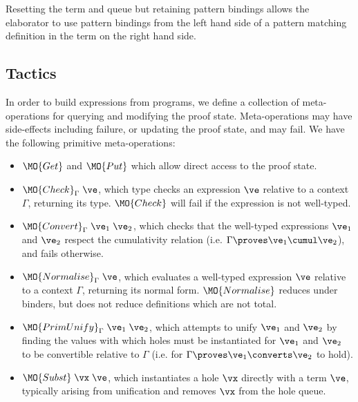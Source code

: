 \DM{
(\vC, \Delta, \hole{\vx}{\vt}\SC\vx, \langle\rangle, \langle\vx\rangle)
}

Resetting the term and queue but retaining pattern bindings
allows the elaborator to use pattern bindings from the left
hand side of a pattern matching definition in the term on the right hand side.


\newcommand{\Check}{\MO{Check}_\Gamma}
\newcommand{\Eval}{\MO{Normalise}_\Gamma}
\newcommand{\Unify}{\MO{Unify}_\Gamma}
\newcommand{\PrimUnify}{\MO{PrimUnify}_\Gamma}
\newcommand{\Subst}{\MO{Subst}}

\subsection{Tactics}

In order to build \TT{} expressions from \Idris{} programs, we define a collection
of meta-operations for querying and modifying the proof state. Meta-operations
may have side-effects including failure, or updating the proof state, and
may fail. We have the following primitive meta-operations:

\begin{itemize}
\item $\MO{Get}$ and $\MO{Put}$ which allow direct access to the proof state.
\item $\Check\;\ve$, which type checks an expression $\ve$ relative to a context
$\Gamma$, returning its type.
$\MO{Check}$ will fail
if the expression is not well-typed.
\item $\MO{Convert}_\Gamma\;\ve_1\;\ve_2$, which checks that the well-typed
expressions $\ve_1$ and $\ve_2$ respect the cumulativity relation 
(i.e. $\Gamma\proves\ve_1\cumul\ve_2$), and fails otherwise.
\item $\Eval\;\ve$, which evaluates a well-typed expression $\ve$ relative to a context 
$\Gamma$, returning its normal form. $\MO{Normalise}$ reduces under binders,
but does not reduce definitions which are not total.
\item 
$\PrimUnify\;\ve_1\;\ve_2$, 
which attempts to unify $\ve_1$ and $\ve_2$ by finding the values with which
holes must be instantiated for $\ve_1$ and $\ve_2$ to be convertible relative
to $\Gamma$ (i.e. for $\Gamma\proves\ve_1\converts\ve_2$ to hold).
\item $\Subst\;\vx\;\ve$, which instantiates a hole $\vx$ directly with a term
$\ve$, typically arising from unification and removes $\vx$ from the hole
queue.
\end{itemize}

